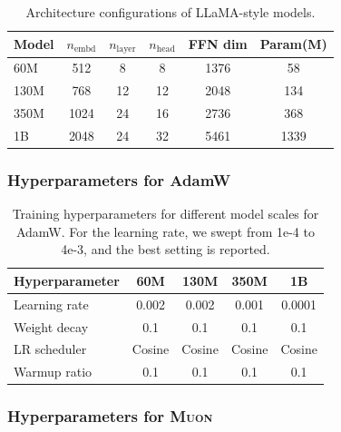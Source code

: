 \documentclass{article}
\theoremstyle{plain}
\theoremstyle{definition}
\theoremstyle{remark}
\begin{document}
\begin{table}[h]
\centering

\begin{tabular}{lccccc}
\toprule
\textbf{Model} & $n_{\text{embd}}$ & $n_{\text{layer}}$ & $n_{\text{head}}$ & FFN dim & Param(M) \\
\midrule
60M  & 512  & 8  & 8  & 1376 & 58 \\
130M & 768  & 12 & 12 & 2048 & 134 \\
350M & 1024 & 24 & 16 & 2736 & 368 \\
1B   & 2048 & 24 & 32 & 5461 & 1339 \\
\bottomrule
\end{tabular}
\caption{Architecture configurations of LLaMA-style models.}
\label{tab:llama_model_configs}
\end{table}

\subsubsection{Hyperparameters for AdamW}

\begin{table}[htb]
\centering

\setlength{\tabcolsep}{3.5pt}
\begin{tabular}{lcccc}
\toprule
\textbf{Hyperparameter} 
& \textbf{60M} 
& \textbf{130M} 
& \textbf{350M} 
& \textbf{1B} \\
\midrule
Learning rate  & 0.002 & 0.002 & 0.001 & 0.0001 \\
Weight decay   & 0.1 & 0.1 & 0.1 & 0.1 \\
LR scheduler   & Cosine & Cosine & Cosine & Cosine \\
Warmup ratio   & 0.1 & 0.1 & 0.1 & 0.1 \\
\bottomrule
\end{tabular}
\caption{Training hyperparameters for different model scales for AdamW. For the learning rate, we swept from 1e-4 to 4e-3, and the best setting is reported.}
\label{tab:training_hparams_llama_adamw}
\end{table}

\subsubsection{Hyperparameters for \textsc{Muon}}
\end{document}
